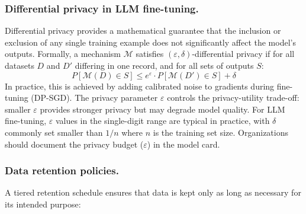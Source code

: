 \subsubsection{Differential privacy in LLM fine-tuning.}

Differential privacy provides a mathematical guarantee that the inclusion or exclusion of any single training example does not significantly affect the model's outputs. Formally, a mechanism $\mathcal{M}$ satisfies $(\varepsilon, \delta)$-differential privacy if for all datasets $D$ and $D'$ differing in one record, and for all sets of outputs $S$:
\[
P[\mathcal{M}(D) \in S] \leq e^{\varepsilon} \cdot P[\mathcal{M}(D') \in S] + \delta
\]
In practice, this is achieved by adding calibrated noise to gradients during fine-tuning (DP-SGD). The privacy parameter $\varepsilon$ controls the privacy-utility trade-off: smaller $\varepsilon$ provides stronger privacy but may degrade model quality. For LLM fine-tuning, $\varepsilon$ values in the single-digit range are typical in practice, with $\delta$ commonly set smaller than $1/n$ where $n$ is the training set size. Organizations should document the privacy budget ($\varepsilon$) in the model card.


\subsubsection{Data retention policies.}

A tiered retention schedule ensures that data is kept only as long as necessary for its intended purpose:

